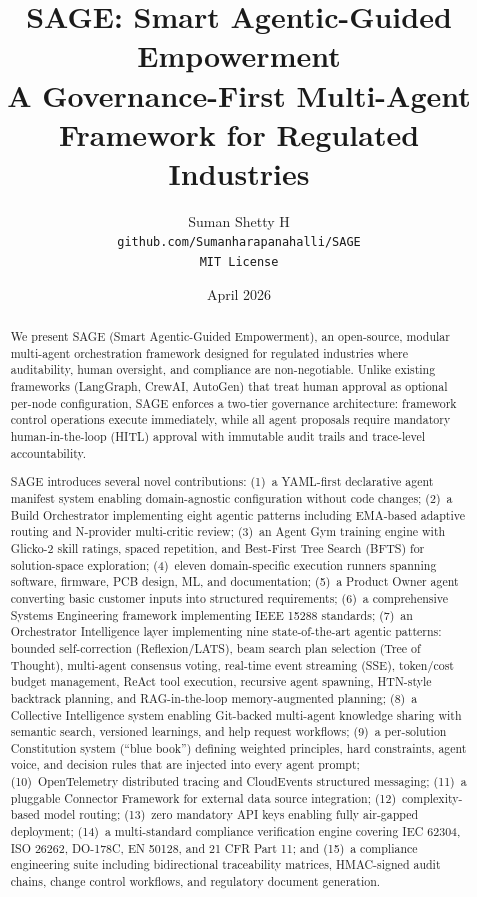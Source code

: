 \documentclass[11pt,a4paper]{article}
\title{
    \textbf{SAGE: Smart Agentic-Guided Empowerment} \\[0.5em]
    \large A Governance-First Multi-Agent Framework for Regulated Industries
}
\author{
    Suman Shetty H \\
    \texttt{github.com/Sumanharapanahalli/SAGE} \\
    \texttt{MIT License}
}
\date{April 2026}
\begin{document}
\maketitle

\begin{abstract}
We present SAGE (Smart Agentic-Guided Empowerment), an open-source, modular multi-agent orchestration framework designed for regulated industries where auditability, human oversight, and compliance are non-negotiable. Unlike existing frameworks (LangGraph, CrewAI, AutoGen) that treat human approval as optional per-node configuration, SAGE enforces a two-tier governance architecture: framework control operations execute immediately, while all agent proposals require mandatory human-in-the-loop (HITL) approval with immutable audit trails and trace-level accountability.

SAGE introduces several novel contributions: (1)~a YAML-first declarative agent manifest system enabling domain-agnostic configuration without code changes; (2)~a Build Orchestrator implementing eight agentic patterns including EMA-based adaptive routing and N-provider multi-critic review; (3)~an Agent Gym training engine with Glicko-2 skill ratings, spaced repetition, and Best-First Tree Search (BFTS) for solution-space exploration; (4)~eleven domain-specific execution runners spanning software, firmware, PCB design, ML, and documentation; (5)~a Product Owner agent converting basic customer inputs into structured requirements; (6)~a comprehensive Systems Engineering framework implementing IEEE 15288 standards; (7)~an Orchestrator Intelligence layer implementing nine state-of-the-art agentic patterns: bounded self-correction (Reflexion/LATS), beam search plan selection (Tree of Thought), multi-agent consensus voting, real-time event streaming (SSE), token/cost budget management, ReAct tool execution, recursive agent spawning, HTN-style backtrack planning, and RAG-in-the-loop memory-augmented planning; (8)~a Collective Intelligence system enabling Git-backed multi-agent knowledge sharing with semantic search, versioned learnings, and help request workflows; (9)~a per-solution Constitution system (``blue book'') defining weighted principles, hard constraints, agent voice, and decision rules that are injected into every agent prompt; (10)~OpenTelemetry distributed tracing and CloudEvents structured messaging; (11)~a pluggable Connector Framework for external data source integration; (12)~complexity-based model routing; (13)~zero mandatory API keys enabling fully air-gapped deployment; (14)~a multi-standard compliance verification engine covering IEC 62304, ISO 26262, DO-178C, EN 50128, and 21 CFR Part 11; and (15)~a compliance engineering suite including bidirectional traceability matrices, HMAC-signed audit chains, change control workflows, and regulatory document generation.


\end{abstract}
\end{document}
